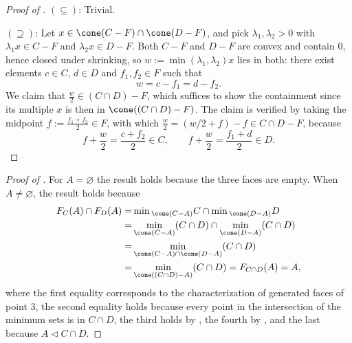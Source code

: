 \documentclass{article}
\theoremstyle{plain}
\theoremstyle{definition}
\theoremstyle{remark}
\begin{document}
\begin{proof}[\hypertarget{loc:difference_cone_with_intersection_of_containing_convex_sets.proof}{}Proof of ]

$(\subseteq)$: Trivial.

$(\supseteq)$: Let $x \in \cone(C-F) \cap \cone(D-F)$, and pick $\lambda_1, \lambda_2 > 0$
with $\lambda_1 x \in C-F$ and $\lambda_2 x \in D-F$. Both $C-F$ and $D-F$ are convex
and contain $0$, hence closed under shrinking, so $w := \min(\lambda_1, \lambda_2)x$
lies in both: there exist elements $c \in C$, $d \in D$ and $f_1, f_2 \in F$ such that
\begin{equation*}
w = c - f_1 = d - f_2.
\end{equation*}
We claim that $\frac{w}{2} \in (C \cap D) - F$, which suffices to show the containment since its multiple $x$ is then in $\cone((C \cap D) - F)$.
The claim is verified by taking the midpoint $f := \frac{f_1 + f_2}{2} \in F$, with which $\frac{w}{2}= (w /2 + f) - f  \in C \cap D - F$, because
\begin{equation*}
f + \frac{w}{2} = \frac{c + f_2}{2} \in C, \qquad f + \frac{w}{2} = \frac{f_1 + d}{2} \in D.
\end{equation*}
\end{proof}
\begin{proof}[\hypertarget{loc:face_of_intersections_is_the_intersection_of_faces.proof}{}Proof of ]

For $A = \varnothing$ the result holds because the three faces are empty. When $A \neq \varnothing$, the result holds because 
\begin{align*}
F_C(A) \cap F_D(A)  = &\min{}_{\cone(C-A)}C \cap \min{}_{\cone(D-A)}D\\
= &\min_{\cone(C-A)} (C \cap D) \cap  \min_{\cone(D-A)}(C \cap D)\\
 = &\min_{\cone(C-A) \cap \cone(D - A)}(C \cap D)\\
=& \min_{\cone((C \cap D) - A)}(C \cap D) =  F_{C \cap D}(A) = A,
\end{align*}
where the first equality corresponds to the characterization of generated faces of  point 3, the second equality holds because every point in the intersection of the minimum sets is in $C \cap D$, the third holds by , the fourth by , and the last because $A \triangleleft C \cap D$.
\end{proof}
\end{document}
